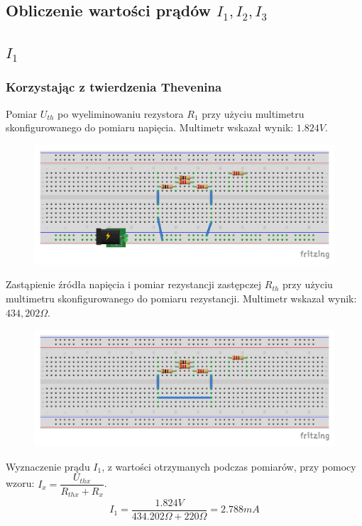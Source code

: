 \documentclass[polish,polish,a4paper]{article}
\begin{document}
\begin{spacing}{2}
	\section{Obliczenie wartości prądów $I_{1},I_{2},I_{3}$}
	\subsection{$I_{1}$}
	\subsubsection{Korzystając z twierdzenia Thevenina}
	Pomiar $U_{th}$ po wyeliminowaniu rezystora $R_{1}$ przy  użyciu multimetru skonfigurowanego do pomiaru napięcia. Multimetr wskazał wynik: $1.824V$.
	\begin{figure}[H]
		\centering
		\includegraphics[scale=0.8]{R1_pomiar_napiecia_bb.pdf}
	\end{figure}

	Zastąpienie źródła napięcia i pomiar rezystancji zastępczej $R_{th}$ przy użyciu multimetru skonfigurowanego do pomiaru rezystancji. Multimetr wskazał wynik: $ 434,202\Omega $.
	\begin{figure}[H]
		\centering
		\includegraphics[scale=0.8]{R1_pomiar_oporu_bb.pdf}
	\end{figure}
	Wyznaczenie prądu $I_{1}$, z wartości otrzymanych podczas pomiarów, przy pomocy wzoru: $I_{x}= \dfrac{U_{thx}}{R_{thx} + R_{x}}$.
	\begin{gather*}
		I_{1}=\dfrac{1.824V}{434.202\Omega + 220\Omega } = 2.788mA
	\end{gather*}

\end{spacing}
\end{document}
